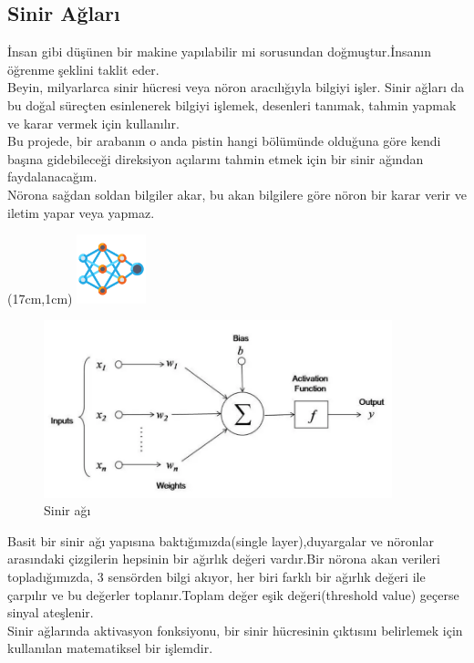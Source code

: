 \documentclass{article}
\begin{document}
\subsection{Sinir Ağları}
İnsan gibi düşünen bir makine yapılabilir mi sorusundan doğmuştur.İnsanın öğrenme şeklini taklit eder.\\[5pt]
Beyin, milyarlarca sinir hücresi veya nöron aracılığıyla bilgiyi işler. Sinir ağları da bu doğal süreçten esinlenerek bilgiyi işlemek, desenleri tanımak, tahmin yapmak ve karar vermek için kullanılır.\\[5pt]
Bu projede, bir arabanın o anda pistin hangi bölümünde olduğuna göre kendi başına gidebileceği direksiyon açılarını tahmin etmek için bir sinir ağından faydalanacağım.\\[5pt]
Nörona sağdan soldan bilgiler akar, bu akan bilgilere göre nöron bir karar verir ve iletim yapar veya yapmaz.

\begin{textblock*}{5cm}(17cm,1cm) %
    \includegraphics[width=2cm]{image/sinir.png} %
\end{textblock*}
\begin{figure}[h]
  \centering
  \includegraphics[width=0.9\textwidth]{image/Resim38.png} %
  \caption{Sinir ağı \cite{sze2017efficient}}
  \label{fig:python36}  
\end{figure}
\noindent Basit bir sinir ağı yapısına baktığımızda(single layer),duyargalar ve nöronlar arasındaki çizgilerin hepsinin bir ağırlık değeri vardır.Bir nörona akan verileri topladığımızda, 3 sensörden bilgi akıyor, her biri farklı bir ağırlık değeri ile çarpılır ve bu değerler toplanır.Toplam değer eşik değeri(threshold value) geçerse sinyal ateşlenir.\\[5pt]
Sinir ağlarında aktivasyon fonksiyonu, bir sinir hücresinin çıktısını belirlemek için kullanılan matematiksel bir işlemdir.
\end{document}
